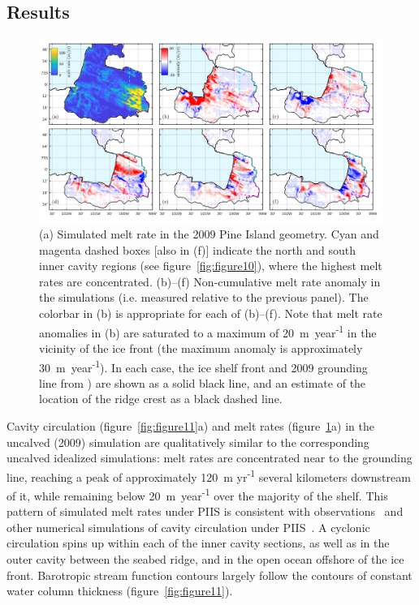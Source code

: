 \documentclass[draft]{agujournal2019}
\begin{document}
\subsection{Results}

\begin{figure}
    \centering
    \includegraphics[width = \textwidth]{../make_figures/plots/figure12.png}
    \caption{(a) Simulated melt rate in the 2009 Pine Island geometry. Cyan and magenta dashed boxes [also in (f)] indicate the north and south inner cavity regions (see figure~\ref{fig:figure10}), where the highest melt rates are concentrated. (b)--(f) Non-cumulative melt rate anomaly in the simulations (i.e. measured relative to the previous panel). The colorbar in (b) is appropriate for each of (b)--(f). Note that melt rate anomalies in (b) are saturated to a maximum of 20~m~year\textsuperscript{-1} in the vicinity of the ice front (the maximum anomaly is approximately 30~m~year\textsuperscript{-1}). In each case, the ice shelf front and 2009 grounding line from ) are shown as a solid black line, and an estimate of the location of the ridge crest as a black dashed line.}
    \label{fig:figure12}
\end{figure}


Cavity circulation (figure~\ref{fig:figure11}a) and melt rates (figure~\ref{fig:figure12}a) in the uncalved (2009) simulation are qualitatively similar to the corresponding uncalved idealized simulations: melt rates are concentrated near to the grounding line, reaching a peak of approximately 120~m yr\textsuperscript{-1} several kilometers downstream of it, while remaining below 20~m~year\textsuperscript{-1} over the majority of the shelf. This pattern of simulated melt rates under PIIS is consistent with observations~\cite{Dutrieux2013Cryosphere} and other numerical simulations of cavity circulation under PIIS~\cite[for example]{Heimbach2012AnnGlac}. A cyclonic circulation spins up within each of the inner cavity sections, as well as in the outer cavity between the seabed ridge, and in the open ocean offshore of the ice front. Barotropic stream function contours largely follow the contours of constant water column thickness (figure~\ref{fig:figure11}).
\end{document}
